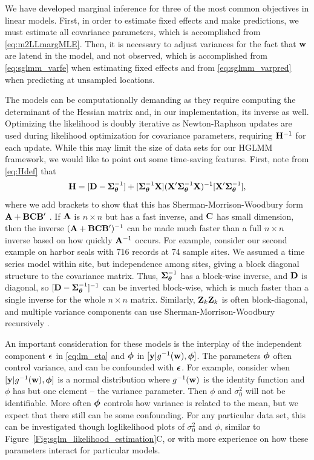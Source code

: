 \documentclass[12pt, titlepage]{article}
\begin{document}
We have developed marginal inference for three of the most common objectives in linear models.  First, in order to estimate fixed effects and make predictions, we must estimate all covariance parameters, which is accomplished from \eqref{eq:m2LLmargMLE}.  Then, it is necessary to adjust variances for the fact that $\mathbf{w}$ are latend in the model, and not observed, which is accomplished from \eqref{eq:sglmm_varfe} when estimating fixed effects and from \eqref{eq:sglmm_varpred} when predicting at unsampled locations.

The models can be computationally demanding as they require computing the determinant of the Hessian matrix and, in our implementation, its inverse as well.  Optimizing the likelihood is doubly iterative as Newton-Raphson updates are used during likelihood optimization for covariance parameters, requiring $\mathbf{H}^{-1}$ for each update.  While this may limit the size of data sets for our HGLMM framework, we would like to point out some time-saving features.  First, note from \eqref{eq:Hdef} that
$$
\mathbf{H} = [\mathbf{D} - \mbox{\boldmath $\Sigma$}_{\boldsymbol{\theta}}^{-1}] + [\mbox{\boldmath $\Sigma$}_{\boldsymbol{\theta}}^{-1}\mathbf{X}](\mathbf{X}^{\prime}\mbox{\boldmath $\Sigma$}_{\boldsymbol{\theta}}^{-1}\mathbf{X})^{-1}[\mathbf{X}^{\prime}\mbox{\boldmath $\Sigma$}_{\boldsymbol{\theta}}^{-1}],
$$ 
where we add brackets to show that this has Sherman-Morrison-Woodbury form $\mathbf{A} + \mathbf{B}\mathbf{C}\mathbf{B}^{\prime}$ \citep{ShermanEtAl1949Adjustmentinversematrix621,Woodbury1950Invertingmodifiedmatrices}.  If $\mathbf{A}$ is $n \times n$ but has a fast inverse, and $\mathbf{C}$ has small dimension, then the inverse $(\mathbf{A} + \mathbf{B}\mathbf{C}\mathbf{B}^{\prime})^{-1}$ can be made much faster than a full $n \times n$ inverse based on how quickly $\mathbf{A}^{-1}$ occurs.  For example, consider our second example on harbor seals with 716 records at 74 sample sites.  We assumed a time series model within site, but independence among sites, giving a block diagonal structure to the covariance matrix.  Thus, $\mbox{\boldmath $\Sigma$}_{\boldsymbol{\theta}}^{-1}$ has a block-wise inverse, and $\mathbf{D}$ is diagonal, so $[\mathbf{D} - \mbox{\boldmath $\Sigma$}_{\boldsymbol{\theta}}^{-1}]^{-1}$ can be inverted block-wise, which is much faster than a single inverse for the whole $n \times n$ matrix.  Similarly, $\mathbf{Z}_{k}\mathbf{Z}_{k}$ is often block-diagonal, and multiple variance components can use Sherman-Morrison-Woodbury recursively \citep{dumelle_linear_2021}.

An important consideration for these models is the interplay of the independent component $\mbox{\boldmath $\epsilon$}$ in \eqref{eq:lm_eta} and $\boldsymbol{\phi}$ in $[\mathbf{y}|g^{-1}(\mathbf{w}),\boldsymbol{\phi}]$. The parameters $\boldsymbol{\phi}$ often control variance, and can be confounded with $\mbox{\boldmath $\epsilon$}$.  For example, consider when $[\mathbf{y}|g^{-1}(\mathbf{w}),\boldsymbol{\phi}]$ is a normal distribution where $g^{-1}(\mathbf{w})$ is the identity function and  $\phi$ has but one element -- the variance parameter.  Then $\phi$ and $\sigma_{0}^{2}$ will not be identifiable.  More often $\boldsymbol{\phi}$ controls how variance is related to the mean, but we expect that there still can be some confounding.  For any particular data set, this can be investigated though loglikelihood plots of $\sigma_{0}^{2}$ and $\phi$, similar to Figure~\ref{Fig:sglm_likelihood_estimation}C, or with more experience on how these parameters interact for particular models.
\end{document}
